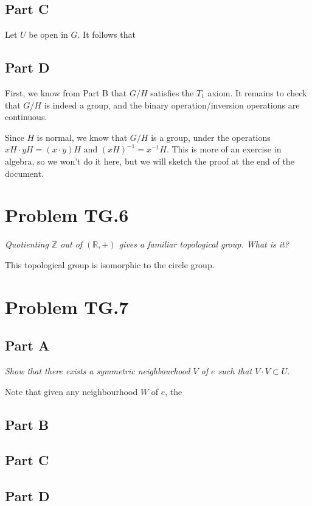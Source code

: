 \documentclass[10pt, oneside]{amsart}
\begin{document}
    \hrulefill

    \subsection{Part C}

    Let $U$ be open in $G$. It follows that 

    \hrulefill

    \subsection{Part D}

    First, we know from Part B that $G/H$ satisfies the $T_1$ axiom. It remains to check that $G/H$ is indeed a group, and the binary operation/inversion operations are continuous.
    \newline

    Since $H$ is normal, we know that $G/H$ is a group, under the operations $xH \cdot yH = (x \cdot y)H$ and $(xH)^{-1} = x^{-1}H$. This is more of an exercise in algebra, so
    we won't do it here, but we will sketch the proof at the end of the document.
    \newline

    \hrulefill

    \section{Problem TG.6}

    \textit{Quotienting $\mathbb{Z}$ out of $(\mathbb{R}, +)$ gives a familiar topological group. What is it?}
    \newline

    This topological group is isomorphic to the circle group.

    \hrulefill

    \section{Problem TG.7}

    \hrulefill

    \subsection{Part A}

    \textit{Show that there exists a symmetric neighbourhood $V$ of $e$ such that $V \cdot V \subset U$.}
    \newline

    Note that given any neighbourhood $W$ of $e$, the 

    \hrulefill

    \subsection{Part B}

    \hrulefill

    \subsection{Part C}

    \hrulefill

    \subsection{Part D}


    \hrulefill


    
\end{document}
